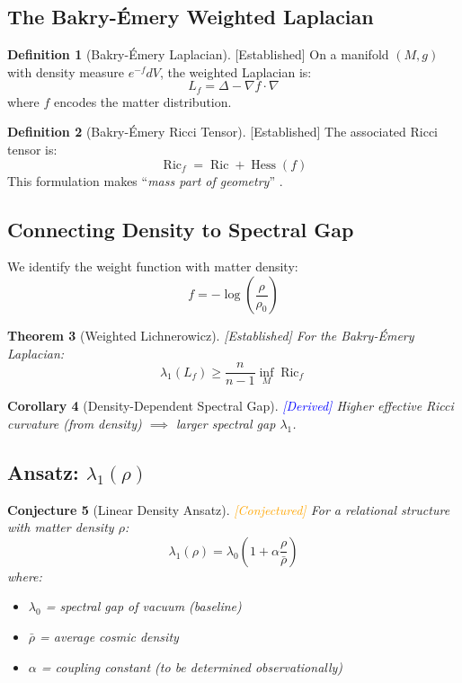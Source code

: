 \documentclass[11pt,a4paper]{article}
\theoremstyle{plain}
\newtheorem{theorem}{Theorem}[section]
\newtheorem{corollary}[theorem]{Corollary}
\newtheorem{conjecture}[theorem]{Conjecture}
\theoremstyle{definition}
\newtheorem{definition}[theorem]{Definition}
\theoremstyle{remark}
\newcommand{\Laplacian}{\Delta}
\newcommand{\Ric}{\operatorname{Ric}}
\newcommand{\Hess}{\operatorname{Hess}}
\newcommand{\established}{\textcolor{green!50!black}{[Established]}}
\newcommand{\derived}{\textcolor{blue}{[Derived]}}
\newcommand{\conjectured}{\textcolor{orange}{[Conjectured]}}
\begin{document}
\subsection{The Bakry-\'{E}mery Weighted Laplacian}

\begin{definition}[Bakry-\'{E}mery Laplacian] \established
On a manifold $(M, g)$ with density measure $e^{-f} dV$, the weighted Laplacian is:
\[
L_f = \Laplacian - \nabla f \cdot \nabla
\]
where $f$ encodes the matter distribution.
\end{definition}

\begin{definition}[Bakry-\'{E}mery Ricci Tensor] \established
The associated Ricci tensor is:
\[
\Ric_f = \Ric + \Hess(f)
\]
This formulation makes ``\emph{mass part of geometry}'' \cite{bakry1985, bakryemery_cosmology}.
\end{definition}

\subsection{Connecting Density to Spectral Gap}

We identify the weight function with matter density:
\[
f = -\log\left(\frac{\rho}{\rho_0}\right)
\]

\begin{theorem}[Weighted Lichnerowicz] \established
For the Bakry-\'{E}mery Laplacian:
\[
\lambda_1(L_f) \geq \frac{n}{n-1} \inf_M \Ric_f
\]
\end{theorem}

\begin{corollary}[Density-Dependent Spectral Gap] \derived
Higher effective Ricci curvature (from density) $\implies$ larger spectral gap $\lambda_1$.
\end{corollary}

\subsection{Ansatz: $\lambda_1(\rho)$}

\begin{conjecture}[Linear Density Ansatz] \conjectured
\label{conj:ansatz}
For a relational structure with matter density $\rho$:
\[
\lambda_1(\rho) = \lambda_0 \left(1 + \alpha \frac{\rho}{\bar{\rho}}\right)
\]
where:
\begin{itemize}[noitemsep]
    \item $\lambda_0$ = spectral gap of vacuum (baseline)
    \item $\bar{\rho}$ = average cosmic density
    \item $\alpha$ = coupling constant (to be determined observationally)
\end{itemize}
\end{conjecture}
\end{document}
